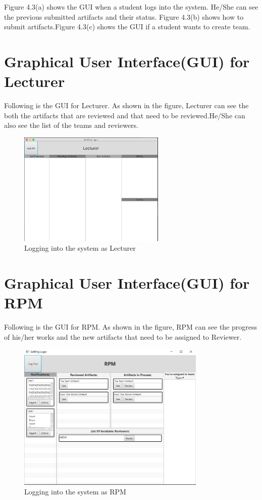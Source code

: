 Figure 4.3(a) shows the GUI when a student logs into the system. He/She can see the previous submitted artifacts and their status. Figure 4.3(b) shows how to submit artifacts.Figure 4.3(c) shows the GUI if a student wants to create team.
\newpage

\section{Graphical User Interface(GUI) for Lecturer}
 Following is the GUI for Lecturer. As shown in the figure, Lecturer can see the both the artifacts that are reviewed and that need to be reviewed.He/She can also see the list of the teams and reviewers.


\begin{figure}[h]
\includegraphics[width=7cm]{content/8.png}
\centering
\caption{Logging into the system as Lecturer}
\end{figure}



\section{Graphical User Interface(GUI) for RPM}
 Following is the GUI for RPM. As shown in the figure, RPM can see the progress of his/her works and the new artifacts that need to be assigned to Reviewer.


\begin{figure}[h]
\includegraphics[width=9cm]{gfx/RPM.png}
\centering
\caption{Logging into the system as RPM}
\end{figure}




